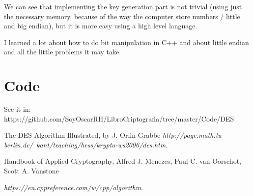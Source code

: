 \documentclass[fleqn, journal, onecolumn]{IEEEtran}             %
\theoremstyle{break}                                            %
\begin{document}
    We can see that implementing the key generation part is not trivial (using just the necessary memory, because of the way
    the computer store numbers / little and big endian), but it is more easy using a high level language.

    I learned a lot about how to do bit manipulation in C++ and about little endian and all the little problems it may take.
  \section{Code}

    See it in: https://github.com/SoyOscarRH/LibroCriptografia/tree/master/Code/DES

    
    
    


  \begin{thebibliography}{10}

        The DES Algorithm Illustrated, by J. Orlin Grabbe
          \textit{http://page.math.tu-berlin.de/~kant/teaching/hess/krypto-ws2006/des.htm}. 

        Handbook of Applied Cryptography, 
        Alfred J. Menezes,
        Paul C. van Oorschot,
        Scott A. Vanstone 

        \textit{https://en.cppreference.com/w/cpp/algorithm}. 




  \end{thebibliography}
\end{document}
